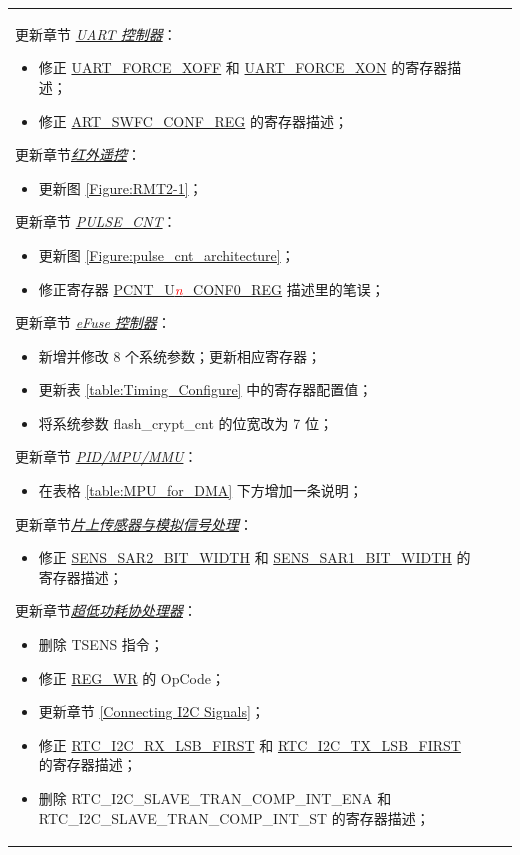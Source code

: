 \begin{longtable}[l]{ | m{2cm} | m{1.5cm} | m{12cm} | }
更新章节 \hyperref[mod:uart]{\it{UART 控制器}}：
\begin{itemize}
\item 修正 \hyperref[regdesc:UARTFORCEXOFF]{UART\_FORCE\_XOFF} 和 \hyperref[regdesc:UARTFORCEXON]{UART\_FORCE\_XON} 的寄存器描述；
\item 修正 \hyperref[regdesc:UARTSWFCCONFREG]{ART\_SWFC\_CONF\_REG} 的寄存器描述；
\end{itemize}

更新章节\hyperref[mod:rmt]{\it{红外遥控}}：
\begin{itemize}
\item 更新图 \ref{Figure:RMT2-1}；
\end{itemize}

更新章节 \hyperref[mod:pcnt]{\it{PULSE\_CNT}}：
\begin{itemize}
\item 更新图 \ref{Figure:pulse_cnt_architecture}；
\item 修正寄存器 \hyperref[regdesc:PCNTUnCONF0REG]{PCNT\_U\textit{\textcolor{red}{\it{n}}}\_CONF0\_REG} 描述里的笔误；
\end{itemize}

更新章节 \hyperref[mod:efuse]{\it{eFuse 控制器}}：
\begin{itemize}
\item 新增并修改 8 个系统参数；更新相应寄存器；
\item 更新表 \ref{table:Timing_Configure} 中的寄存器配置值；
\item 将系统参数 flash\_crypt\_cnt 的位宽改为 7 位；
\end{itemize}

更新章节 \hyperref[mod:mmumpu]{\it{PID/MPU/MMU}}：
\begin{itemize}
\item 在表格 \ref{table:MPU_for_DMA} 下方增加一条说明；
\end{itemize}

更新章节\hyperref[mod:sensor]{\it{片上传感器与模拟信号处理}}：
\begin{itemize}
\item 修正 \hyperref[SENSSAR2BITWIDTH]{SENS\_SAR2\_BIT\_WIDTH} 和 \hyperref[SENSSAR1BITWIDTH]{SENS\_SAR1\_BIT\_WIDTH} 的寄存器描述；
\end{itemize}

更新章节\hyperref[mod:ulp]{\it{超低功耗协处理器}}：
\begin{itemize}
\item 删除 TSENS 指令；
\item 修正 \hyperref[subsection:REG_WR]{REG\_WR} 的 OpCode；
\item 更新章节 \ref{Connecting I2C Signals}；
\item 修正 \hyperref[RTCI2CRXLSBFIRST]{RTC\_I2C\_RX\_LSB\_FIRST} 和 \hyperref[RTCI2CTXLSBFIRST]{RTC\_I2C\_TX\_LSB\_FIRST} 的寄存器描述；
\item 删除 RTC\_I2C\_SLAVE\_TRAN\_COMP\_INT\_ENA 和 RTC\_I2C\_SLAVE\_TRAN\_COMP\_INT\_ST 的寄存器描述；
\end{itemize}


\end{longtable}
